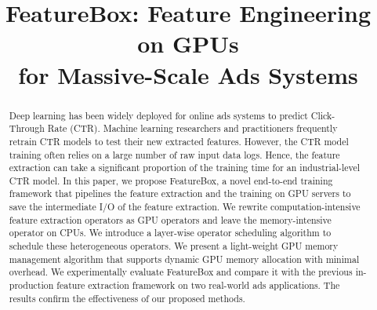 \documentclass[conference]{IEEEtran}
\begin{document}
\title{FeatureBox: Feature Engineering on GPUs\\ for Massive-Scale Ads Systems} 

\author{
}

\maketitle
 


\begin{abstract}
Deep learning has been widely deployed for online ads systems to predict Click-Through Rate (CTR). Machine learning researchers and practitioners frequently retrain CTR models to test their new extracted features. However, the CTR model training often relies on a large number of raw input data logs. Hence, the feature extraction can take a significant proportion of the training time for an industrial-level CTR model. In this paper, we propose FeatureBox, a novel end-to-end training framework that pipelines the feature extraction and the training on GPU servers to save the intermediate I/O of the feature extraction. We rewrite computation-intensive feature extraction operators as GPU operators and leave the memory-intensive operator on CPUs. We introduce a layer-wise operator scheduling algorithm to schedule these heterogeneous operators. We present a light-weight GPU memory management algorithm that supports dynamic GPU memory allocation with minimal overhead. We experimentally evaluate FeatureBox and compare it with the previous in-production feature extraction framework on two real-world ads applications. The results confirm the effectiveness of our proposed methods.
\end{abstract}

\vspace{0.05in}
\end{document}
